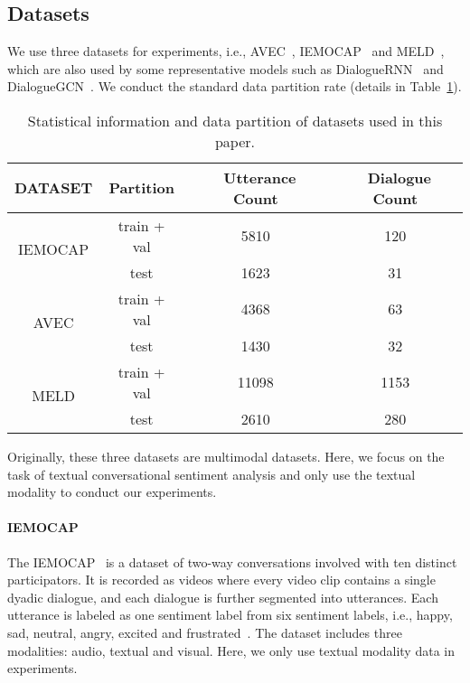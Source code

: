 \documentclass[journal]{IEEEtran}
\begin{document}
\subsection{Datasets}
We use three datasets for experiments, i.e., AVEC~\cite{schuller2012avec}, IEMOCAP~\cite{busso2008iemocap} and MELD~\cite{poria2018meld}, which are also used by some representative models such as DialogueRNN~\cite{majumder2019dialoguernn} and DialogueGCN~\cite{ghosal2019dialoguegcn}. We conduct the standard data partition rate (details in Table~\ref{tab:data}).\begin{table}[!htb]
    \centering
\begin{tabular}{|c|c|c|c|}
        \hline
        DATASET & Partition & \ Utterance Count & \ Dialogue Count \\
        \hline
        \hline
        \multirow{2}{*}{IEMOCAP} & train + val & 5810 & 120 \\
        \cline{2-4}
        & test & 1623 & 31 \\
        \hline
        \multirow{2}{*}{AVEC} & train + val & 4368 & 63 \\
        \cline{2-4}
        & test & 1430 & 32 \\
        \hline
        \multirow{2}{*}{MELD} & train + val & 11098 & 1153 \\
        \cline{2-4}
        & test & 2610 & 280 \\
        \hline
    \end{tabular}
\caption{Statistical information and data partition of datasets used in this paper.}
    \label{tab:data}
\end{table}{}

Originally, these three datasets are multimodal datasets. Here, we focus on the task of textual conversational sentiment analysis and only use the textual modality to conduct our experiments.

\paragraph{IEMOCAP}
The IEMOCAP~\cite{busso2008iemocap} is a dataset of two-way conversations involved with ten distinct participators. It is recorded as videos where every video clip contains a single dyadic dialogue, and each dialogue is further segmented into utterances. Each utterance is labeled as one sentiment label from six sentiment labels, i.e., happy, sad, neutral, angry, excited and frustrated~\cite{susanto2020hourglass}. The dataset includes three modalities: audio, textual and visual. Here, we only use textual modality data in experiments.
\end{document}
